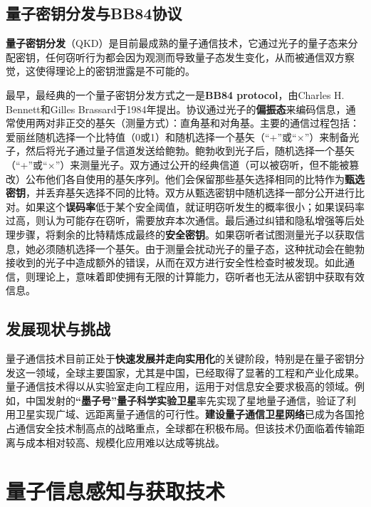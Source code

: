\documentclass{article}
\begin{document}
\subsection{量子密钥分发与BB84协议}

\textbf{量子密钥分发}（QKD）是目前最成熟的量子通信技术，它通过光子的量子态来分配密钥，任何窃听行为都会因为观测而导致量子态发生变化，从而被通信双方察觉，这使得理论上的密钥泄露是不可能的。

最早，最经典的一个量子密钥分发方式之一是\textbf{BB84 protocol}，由Charles H. Bennett和Gilles Brassard于1984年提出。协议通过光子的\textbf{偏振态}来编码信息，通常使用两对非正交的基矢（测量方式）：直角基和对角基。主要的通信过程包括：爱丽丝随机选择一个比特值（0或1）和随机选择一个基矢（“+”或“$\times$”）来制备光子，然后将光子通过量子信道发送给鲍勃。鲍勃收到光子后，随机选择一个基矢（“+”或“$\times$”）来测量光子。双方通过公开的经典信道（可以被窃听，但不能被篡改）公布他们各自使用的基矢序列。他们会保留那些基矢选择相同的比特作为\textbf{甄选密钥}，并丢弃基矢选择不同的比特。双方从甄选密钥中随机选择一部分公开进行比对。如果这个\textbf{误码率}低于某个安全阈值，就证明窃听发生的概率很小；如果误码率过高，则认为可能存在窃听，需要放弃本次通信。最后通过纠错和隐私增强等后处理步骤，将剩余的比特精炼成最终的\textbf{安全密钥}。如果窃听者试图测量光子以获取信息，她必须随机选择一个基矢。由于测量会扰动光子的量子态，这种扰动会在鲍勃接收到的光子中造成额外的错误，从而在双方进行安全性检查时被发现。如此通信，则理论上，意味着即使拥有无限的计算能力，窃听者也无法从密钥中获取有效信息。\cite{reddy2023comprehensive}

\subsection{发展现状与挑战}

量子通信技术目前正处于\textbf{快速发展并走向实用化}的关键阶段，特别是在量子密钥分发这一领域，全球主要国家，尤其是中国，已经取得了显著的工程和产业化成果。量子通信技术得以从实验室走向工程应用，运用于对信息安全要求极高的领域。例如，中国发射的\textbf{“墨子号”量子科学实验卫星}率先实现了星地量子通信，验证了利用卫星实现广域、远距离量子通信的可行性。\textbf{建设量子通信卫星网络}已成为各国抢占通信安全技术制高点的战略重点，全球都在积极布局。但该技术仍面临着传输距离与成本相对较高、规模化应用难以达成等挑战。

\section{量子信息感知与获取技术}
\end{document}
